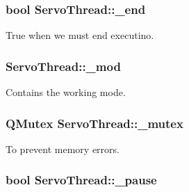 \hypertarget{a00007_acca9896d1a2d1ef68527e6834f81c76c}{}
\subsubsection[{\+\_\+end}]{\setlength{\rightskip}{0pt plus 5cm}bool Servo\+Thread\+::\+\_\+end\hspace{0.3cm}{\ttfamily [private]}}\label{a00007_acca9896d1a2d1ef68527e6834f81c76c}


True when we must end executino. 

\hypertarget{a00007_acdecea1688594d3ab7386a6db97dd90d}{}
\subsubsection[{\+\_\+mod}]{ Servo\+Thread\+::\+\_\+mod\hspace{0.3cm}{\ttfamily [private]}}\label{a00007_acdecea1688594d3ab7386a6db97dd90d}


Contains the working mode. 

\hypertarget{a00007_a6327eafc0dac189ec1b202d63ef32457}{}
\subsubsection[{\+\_\+mutex}]{\setlength{\rightskip}{0pt plus 5cm}Q\+Mutex Servo\+Thread\+::\+\_\+mutex\hspace{0.3cm}{\ttfamily [private]}}\label{a00007_a6327eafc0dac189ec1b202d63ef32457}


To prevent memory errors. 

\hypertarget{a00007_aaf2ef80e8e43518b75d20a5102970d2e}{}
\subsubsection[{\+\_\+pause}]{\setlength{\rightskip}{0pt plus 5cm}bool Servo\+Thread\+::\+\_\+pause\hspace{0.3cm}{\ttfamily [private]}}\label{a00007_aaf2ef80e8e43518b75d20a5102970d2e}



